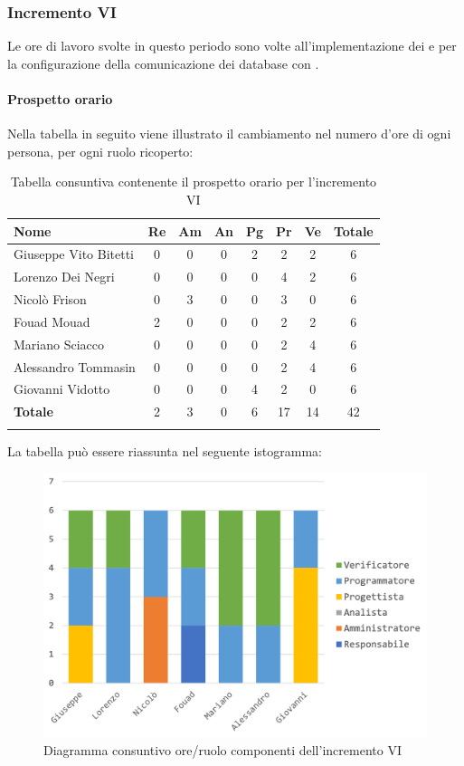 			
		\subsubsection{Incremento VI }
			Le ore di lavoro svolte in questo periodo sono volte all'implementazione dei   e per la configurazione della comunicazione dei database con .
			\paragraph{Prospetto orario}
			Nella tabella in seguito viene illustrato il cambiamento nel numero d'ore di ogni persona, per ogni ruolo ricoperto:
			\begin{longtable}{|l|c|c|c|c|c|c|c|}
				\hline
				\rowcolor{lighter-grayer}
				\textbf{Nome} & \textbf{Re} & \textbf{Am} & \textbf{An} & \textbf{Pg}  & \textbf{Pr}   & \textbf{Ve} & \textbf{Totale} \\
				\hline
				\endfirsthead
				
				\hline
				Giuseppe Vito Bitetti 		 & 0 & 0 & 0 & 2 & 2 & 2 & 6\\
				\hline
				\hline
				Lorenzo Dei Negri			 & 0 & 0 & 0 & 0 & 4 & 2 & 6\\
				\hline
				\hline
				Nicolò Frison				      & 0 & 3 & 0 & 0 & 3 & 0 & 6\\
				\hline
				\hline
				Fouad Mouad 				   & 2 & 0 & 0 & 0 & 2 & 2 & 6\\
				\hline
				\hline
				Mariano Sciacco 			 & 0 & 0 & 0 & 0 & 2 & 4 & 6\\
				\hline
				\hline
				Alessandro Tommasin    & 0 & 0 & 0 & 0 & 2 & 4 & 6\\
				\hline
				\hline
				Giovanni Vidotto 			  & 0 & 0 & 0 & 4 & 2 & 0 & 6\\
				\hline 
				\textbf{Totale}			 		& 2 & 3 & 0 & 6 & 17 & 14 & 42\\
				\hline
				\caption{Tabella consuntiva contenente il prospetto orario per l'incremento VI}
			\end{longtable}	
	
			La tabella può essere riassunta nel seguente istogramma:
			
			\begin{figure}[H]
			\centering
			\includegraphics[width=0.75\linewidth]{./images/preventivo/incremento6-1.png}
			\caption{Diagramma consuntivo ore/ruolo componenti dell'incremento VI}
			\label{fig:consuntivo diagramma suddivisione ruoli incremento VI}
			\end{figure}



